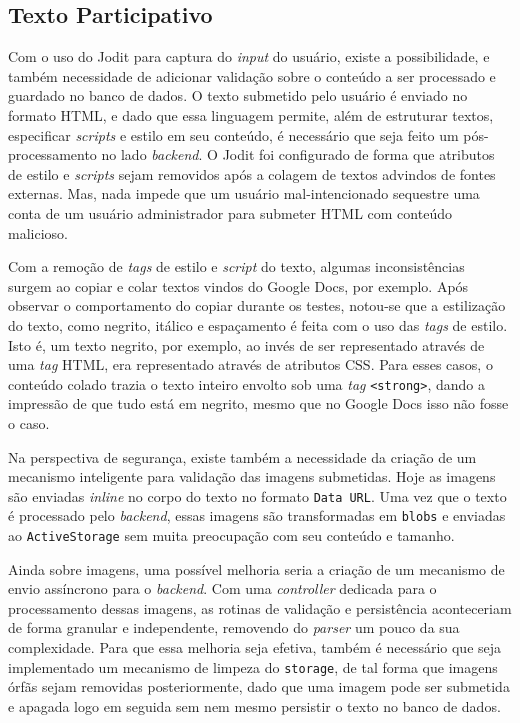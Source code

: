 \subsection {Texto Participativo}

Com o uso do Jodit para captura do \textit{input} do usuário, existe a possibilidade, e também necessidade de adicionar validação sobre o conteúdo a ser processado e guardado no banco de dados.
O texto submetido pelo usuário é enviado no formato HTML, e dado que essa linguagem permite, além de estruturar textos, especificar \textit{scripts} e estilo em seu conteúdo, é necessário que seja feito um pós-processamento no lado \textit{backend}.
O Jodit foi configurado de forma que atributos de estilo e \textit{scripts} sejam removidos após a colagem de textos advindos de fontes externas.
Mas, nada impede que um usuário mal-intencionado sequestre uma conta de um usuário administrador para submeter HTML com conteúdo malicioso.

Com a remoção de \textit{tags} de estilo e \textit{script} do texto, algumas inconsistências surgem ao copiar e colar textos vindos do Google Docs, por exemplo.
Após observar o comportamento do copiar durante os testes, notou-se que a estilização do texto, como negrito, itálico e espaçamento é feita com o uso das \textit{tags} de estilo.
Isto é, um texto negrito, por exemplo, ao invés de ser representado através de uma \textit{tag} HTML, era representado através de atributos CSS.
Para esses casos, o conteúdo colado trazia o texto inteiro envolto sob uma \textit{tag} \texttt{<strong>}, dando a impressão de que tudo está em negrito, mesmo que no Google Docs isso não fosse o caso.

Na perspectiva de segurança, existe também a necessidade da criação de um mecanismo inteligente para validação das imagens submetidas.
Hoje as imagens são enviadas \textit{inline} no corpo do texto no formato \texttt{Data URL}.
Uma vez que o texto é processado pelo \textit{backend}, essas imagens são transformadas em \texttt{blobs} e enviadas ao \texttt{ActiveStorage} sem muita preocupação com seu conteúdo e tamanho.

Ainda sobre imagens, uma possível melhoria seria a criação de um mecanismo de envio assíncrono para o \textit{backend}.
Com uma \textit{controller} dedicada para o processamento dessas imagens, as rotinas de validação e persistência aconteceriam de forma granular e independente, removendo do \textit{parser} um pouco da sua complexidade.
Para que essa melhoria seja efetiva, também é necessário que seja implementado um mecanismo de limpeza do \texttt{storage}, de tal forma que imagens órfãs sejam removidas posteriormente, dado que uma imagem pode ser submetida e apagada logo em seguida sem nem mesmo persistir o texto no banco de dados.

